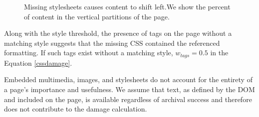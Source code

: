 \begin{figure}[h!]
  \begin{center}
    \qquad
  \end{center}
  \label{full}
  \caption{Missing stylesheets causes content to shift left.We show the percent of content in the vertical partitions of the page.}
\end{figure}


Along with the style threshold, the presence of tags on the page without a matching style suggests that the missing CSS contained the referenced formatting. If such tags exist without a matching style, $w_{tags}=0.5$ in the Equation \ref{cssdamage}. 

Embedded multimedia, images, and stylesheets do not account for the entirety of a page's importance and usefulness. We assume that text, as defined by the DOM and included on the page, is available regardless of archival success and therefore does not contribute to the damage calculation.


